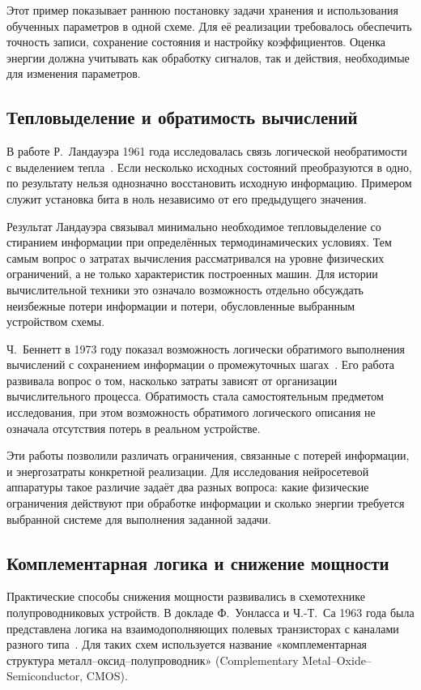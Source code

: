 Этот пример показывает раннюю постановку задачи хранения
и использования обученных параметров в одной схеме.
Для её реализации требовалось обеспечить точность записи,
сохранение состояния и настройку коэффициентов.
Оценка энергии должна учитывать как обработку сигналов,
так и действия, необходимые для изменения параметров.

\subsection{Тепловыделение и обратимость вычислений}

В работе Р.~Ландауэра 1961 года исследовалась связь логической
необратимости с выделением тепла~\cite{landauer1961}.
Если несколько исходных состояний преобразуются в одно,
по результату нельзя однозначно восстановить исходную информацию.
Примером служит установка бита в ноль независимо от его
предыдущего значения.

Результат Ландауэра связывал минимально необходимое
тепловыделение со стиранием информации при определённых
термодинамических условиях. Тем самым вопрос о затратах
вычисления рассматривался на уровне физических ограничений,
а не только характеристик построенных машин. Для истории
вычислительной техники это означало возможность отдельно
обсуждать неизбежные потери информации и потери,
обусловленные выбранным устройством схемы.

Ч.~Беннетт в 1973 году показал возможность логически обратимого
выполнения вычислений с сохранением информации
о промежуточных шагах~\cite{bennett1973}. Его работа развивала
вопрос о том, насколько затраты зависят от организации
вычислительного процесса. Обратимость стала самостоятельным
предметом исследования, при этом возможность обратимого
логического описания не означала отсутствия потерь
в реальном устройстве.

Эти работы позволили различать ограничения, связанные
с потерей информации, и энергозатраты конкретной реализации.
Для исследования нейросетевой аппаратуры такое различие
задаёт два разных вопроса: какие физические ограничения
действуют при обработке информации и сколько энергии
требуется выбранной системе для выполнения заданной задачи.

\subsection{Комплементарная логика и снижение мощности}

Практические способы снижения мощности развивались
в схемотехнике полупроводниковых устройств. В докладе
Ф.~Уонласса и Ч.-Т.~Са 1963 года была представлена логика
на взаимодополняющих полевых транзисторах с каналами
разного типа~\cite{wanlass1963}. Для таких схем используется
название «комплементарная структура металл--оксид--полупроводник»
(Complementary Metal--Oxide--Semiconductor, CMOS).

